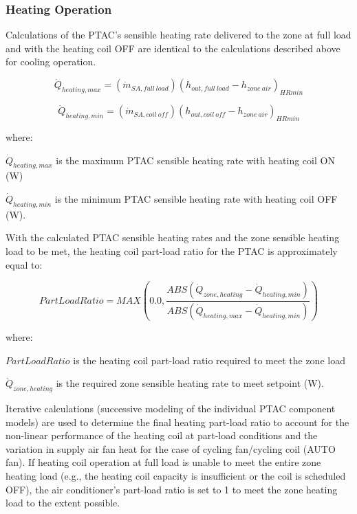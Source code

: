 \subsubsection{Heating Operation}\label{heating-operation-001}

Calculations of the PTAC's sensible heating rate delivered to the zone at full load and with the heating coil OFF are identical to the calculations described above for cooling operation.

\begin{equation}
  \dot{Q}_{heating,max} = \left( \dot{m}_{SA,full~load} \right) \left( h_{out,full~load} - {h_{zone~air}} \right)_{HRmin}
\end{equation}

\begin{equation}
  \dot{Q}_{heating,min} = \left( \dot{m}_{SA,coil~off} \right) \left( h_{out,coil~off} - h_{zone~air} \right)_{HRmin}
\end{equation}

where:

\(\dot{Q}_{heating,max}\) is the maximum PTAC sensible heating rate with heating coil ON (W)

\(\dot{Q}_{heating,min}\) is the minimum PTAC sensible heating rate with heating coil OFF (W).

With the calculated PTAC sensible heating rates and the zone sensible heating load to be met, the heating coil part-load ratio for the PTAC is approximately equal to:

\begin{equation}
  PartLoadRatio = MAX \left( 0.0, \frac{ABS \left( \dot{Q}_{zone,heating} - \dot{Q}_{heating,min} \right)}{ABS \left( \dot{Q}_{heating,max} - \dot{Q}_{heating,min} \right)} \right)
\end{equation}

where:

\(PartLoadRatio\) is the heating coil part-load ratio required to meet the zone load

\(\dot{Q}_{zone,heating}\) is the required zone sensible heating rate to meet setpoint (W).

Iterative calculations (successive modeling of the individual PTAC component models) are used to determine the final heating part-load ratio to account for the non-linear performance of the heating coil at part-load conditions and the variation in supply air fan heat for the case of cycling fan/cycling coil (AUTO fan). If heating coil operation at full load is unable to meet the entire zone heating load (e.g., the heating coil capacity is insufficient or the coil is scheduled OFF), the air conditioner's part-load ratio is set to 1 to meet the zone heating load to the extent possible.

